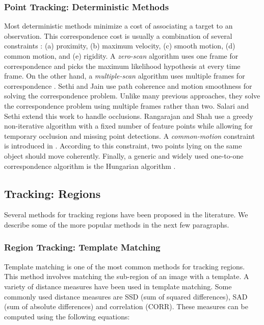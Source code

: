 \documentclass[12pt,letterpaper,doublespaced,ETD,proposal]{gt-ece-thesis}
\begin{document}
\begin{Body}
\subsubsection{Point Tracking: Deterministic Methods}
Most deterministic methods minimize a cost of associating a target to an observation.  This correspondence cost is usually a combination of several constraints \cite{2006_JNL_SURVEYtrk_Yilmaz}: (a) proximity, (b) maximum velocity, (c) smooth motion, (d) common motion, and (e) rigidity.  A \emph{zero-scan} algorithm uses one frame for correspondence and picks the maximum likelihood hypothesis at every time frame.  On the other hand, a \emph{multiple-scan} algorithm uses multiple frames for correspondence \cite{1979_JNL_MTT_Reid}.    Sethi and Jain \cite{1987_JNL_FeatureTrajectories_Sethi} use path coherence and motion smoothness for solving the correspondence problem.  Unlike many previous approaches, they solve the correspondence problem using multiple frames rather than two.  Salari and Sethi \cite{1990_JNL_PointCorresp_Salari} extend this work to handle occlusions.  Rangarajan and Shah \cite{1991_JNL_MotionCorrespondence_Rangarajan} use a greedy non-iterative algorithm with a fixed number of feature points while allowing for temporary occlusion and missing point detections.  A \emph{common-motion} constraint is introduced in \cite{2001_JNL_MotionCorrespondence_Veenman}.  According to this constraint, two points lying on the same object should move coherently.  Finally, a generic and widely used one-to-one correspondence algorithm is the Hungarian algorithm \cite{1955_JNL_HungarianMethod_Kuhn}.

\subsection{Tracking: Regions}
Several methods for tracking regions have been proposed in the literature.  We describe some of the more popular methods in the next few paragraphs.

\subsubsection{Region Tracking: Template Matching}
Template matching is one of the most common methods for tracking regions.  This method involves matching the sub-region of an image with a template.  A variety of distance measures have been used in template matching.  Some commonly used distance measures are SSD (sum of squared differences), SAD (sum of absolute differences) and correlation (CORR).  These measures can be computed using the following equations:



\end{Body}
\end{document}

